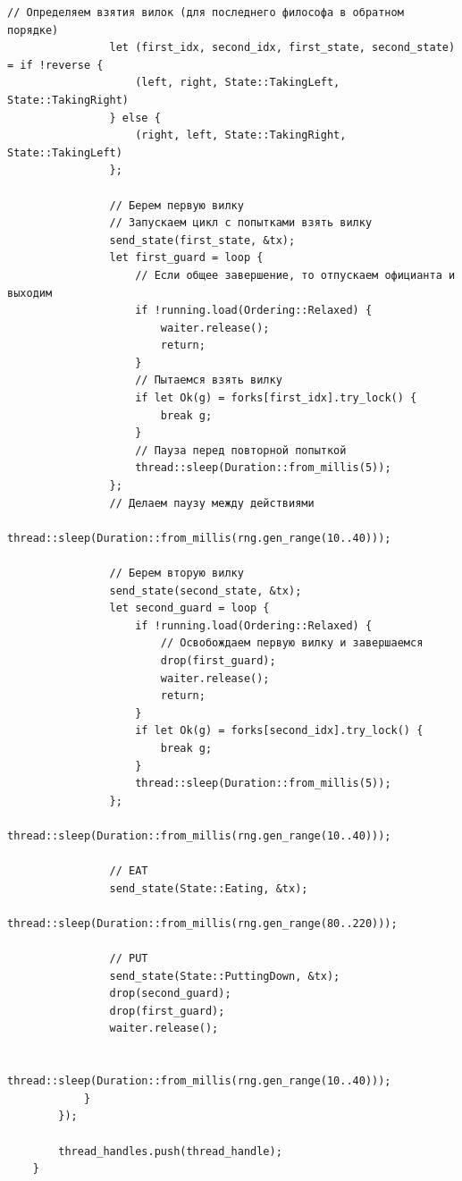 \documentclass[a4paper, 14pt]{extarticle}
\begin{document}
\begin{lstlisting}[caption={Исходный код программы}, label={lst:source_code}]
                // Определяем взятия вилок (для последнего философа в обратном порядке)
                let (first_idx, second_idx, first_state, second_state) = if !reverse {
                    (left, right, State::TakingLeft, State::TakingRight)
                } else {
                    (right, left, State::TakingRight, State::TakingLeft)
                };

                // Берем первую вилку
                // Запускаем цикл с попытками взять вилку
                send_state(first_state, &tx);
                let first_guard = loop {
                    // Если общее завершение, то отпускаем официанта и выходим
                    if !running.load(Ordering::Relaxed) {
                        waiter.release();
                        return;
                    }
                    // Пытаемся взять вилку
                    if let Ok(g) = forks[first_idx].try_lock() {
                        break g;
                    }
                    // Пауза перед повторной попыткой
                    thread::sleep(Duration::from_millis(5));
                };
                // Делаем паузу между действиями
                thread::sleep(Duration::from_millis(rng.gen_range(10..40)));

                // Берем вторую вилку
                send_state(second_state, &tx);
                let second_guard = loop {
                    if !running.load(Ordering::Relaxed) {
                        // Освобождаем первую вилку и завершаемся
                        drop(first_guard);
                        waiter.release();
                        return;
                    }
                    if let Ok(g) = forks[second_idx].try_lock() {
                        break g;
                    }
                    thread::sleep(Duration::from_millis(5));
                };
                thread::sleep(Duration::from_millis(rng.gen_range(10..40)));

                // EAT
                send_state(State::Eating, &tx);
                thread::sleep(Duration::from_millis(rng.gen_range(80..220)));

                // PUT
                send_state(State::PuttingDown, &tx);
                drop(second_guard);
                drop(first_guard);
                waiter.release();

                thread::sleep(Duration::from_millis(rng.gen_range(10..40)));
            }
        });

        thread_handles.push(thread_handle);
    }


\end{lstlisting}
\end{document}
